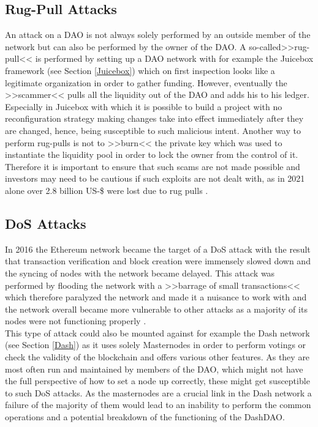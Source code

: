 \documentclass[a4paper,12pt]{report}
\begin{document}
	    \subsection{Rug-Pull Attacks} \label{RugPulls}
	    \startsubsection
	        An attack on a DAO is not always solely performed by an outside member of the network but can also be performed by the owner of the DAO. A so-called>>rug-pull<< is performed by setting up a DAO network with for example the Juicebox framework (see Section \ref{Juicebox}) which on first inspection looks like a legitimate organization in order to gather funding. However, eventually the >>scammer<< pulls all the liquidity out of the DAO and adds his to his ledger. Especially in Juicebox with which it is possible to build a project with no reconfiguration strategy making changes take into effect immediately after they are changed, hence, being susceptible to such malicious intent. Another way to perform rug-pulls is not to >>burn<< the private key which was used to instantiate the liquidity pool in order to lock the owner from the control of it. Therefore it is important to ensure that such scams are not made possible and investors may need to be cautious if such exploits are not dealt with, as in 2021 alone over 2.8 billion US-\$ were lost due to rug pulls \parencite{RugPull}.
	    \closesection
	    \subsection{DoS Attacks}
	    \startsubsection
	        In 2016 the Ethereum network became the target of a DoS attack with the result that transaction verification and block creation were immensely slowed down and the syncing of nodes with the network became delayed. This attack was performed by flooding the network with a >>barrage of small transactions<< which therefore paralyzed the network and made it a nuisance to work with and the network overall became more vulnerable to other attacks as a majority of its nodes were not functioning properly \parencite{EthDoSAttack}. \\
	        This type of attack could also be mounted against for example the Dash network (see Section \ref{Dash}) as it uses solely Masternodes in order to perform votings or check the validity of the blockchain and offers various other features. As they are most often run and maintained by members of the DAO, which might not have the full perspective of how to set a node up correctly, these might get susceptible to such DoS attacks. As the masternodes are a crucial link in the Dash network a failure of the majority of them would lead to an inability to perform the common operations and a potential breakdown of the functioning of the DashDAO.\\
	    \closesection
	\closesection
	
\end{document}
